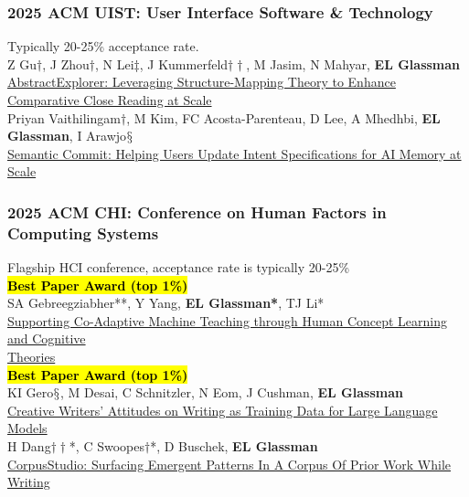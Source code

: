 \documentclass[10pt, a4paper]{article}
\newcommand{\years}[1]{\marginnote{\normalsize #1}}
\begin{document}

\subsubsection*{2025 ACM \textbf{UIST}: User Interface Software \& Technology }
Typically 20-25\% acceptance rate.\\

\years{\textbf{C40}}Z Gu$\dagger$, J Zhou$\dagger$, N Lei$\ddagger$, J Kummerfeld$\dagger\dagger$, M Jasim, N Mahyar, \textbf{EL Glassman}\\ \href{https://glassmanlab.seas.harvard.edu/papers/abstractexplorer.pdf}{AbstractExplorer: Leveraging Structure-Mapping Theory to Enhance Comparative Close Reading at Scale}\\
[0.2cm]
\years{\textbf{C39}}Priyan Vaithilingam$\dagger$, M Kim, FC Acosta-Parenteau, D Lee, A Mhedhbi, \textbf{EL Glassman}, I Arawjo$\mathsection$\\ \href{https://glassmanlab.seas.harvard.edu/papers/semantic_commit.pdf}{Semantic Commit: Helping Users Update Intent Specifications for AI Memory at Scale}

\subsubsection*{2025 ACM \textbf{CHI}: Conference on Human Factors in Computing Systems}
Flagship HCI conference, acceptance rate is typically 20-25\%\\

\years{\textbf{C38}}\hl{\textbf{Best Paper Award (top 1\%)}}\\
SA Gebreegziabher**, Y Yang, \textbf{EL Glassman*}, TJ Li*\\\href{https://glassmanlab.seas.harvard.edu/papers/mocha_chi25.pdf}{Supporting Co-Adaptive Machine Teaching through Human Concept Learning and Cognitive\\ Theories}\\
[0.2cm]
\years{\textbf{C37}}\hl{\textbf{Best Paper Award (top 1\%)}}\\
KI Gero$\mathsection$, M Desai, C Schnitzler, N Eom, J Cushman, \textbf{EL Glassman}\\
\href{https://arxiv.org/abs/2409.14281}{Creative Writers’ Attitudes on Writing as Training Data for Large Language Models}\\
[0.2cm]
\years{\textbf{C36}} H Dang$\dagger\dagger$*, C Swoopes$\dagger$*, D Buschek, \textbf{EL Glassman}\\
\href{https://glassmanlab.seas.harvard.edu/papers/corpusstudio.pdf}{CorpusStudio: Surfacing Emergent Patterns In A Corpus Of Prior Work While Writing}
\end{document}
